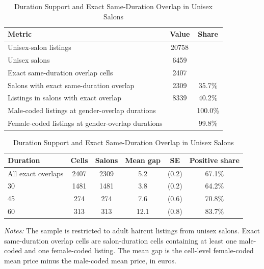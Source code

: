 \begin{table}[htbp]
  \centering
  \caption{Duration Support and Exact Same-Duration Overlap in Unisex Salons}
  \label{tab:duration_overlap}
  \small
\begin{tabular}{lcc}
\hline
Metric & Value & Share \\
\hline
Unisex-salon listings & 20758 &  \\
Unisex salons & 6459 &  \\
Exact same-duration overlap cells & 2407 &  \\
Salons with exact same-duration overlap & 2309 & 35.7\% \\
Listings in salons with exact overlap & 8339 & 40.2\% \\
Male-coded listings at gender-overlap durations &  & 100.0\% \\
Female-coded listings at gender-overlap durations &  & 99.8\% \\
\hline
\end{tabular}
\vspace{0.25cm}

\begin{tabular}{lccccc}
\hline
Duration & Cells & Salons & Mean gap & SE & Positive share \\
\hline
All exact overlaps & 2407 & 2309 & 5.2 & (0.2) & 67.1\% \\
30 & 1481 & 1481 & 3.8 & (0.2) & 64.2\% \\
45 & 274 & 274 & 7.6 & (0.6) & 70.8\% \\
60 & 313 & 313 & 12.1 & (0.8) & 83.7\% \\
\hline
\end{tabular}

\begin{minipage}{0.94\linewidth}
\footnotesize
\textit{Notes:} The sample is restricted to adult haircut listings from unisex salons.
Exact same-duration overlap cells are salon-duration cells containing at least one male-coded and one female-coded listing.
The mean gap is the cell-level female-coded mean price minus the male-coded mean price, in euros.
\end{minipage}
\end{table}
